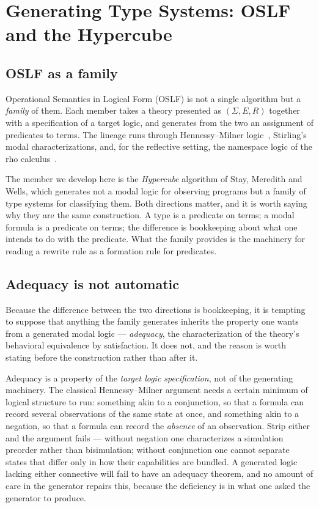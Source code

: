 \chapter{Generating Type Systems: OSLF and the Hypercube}
\label{ch:hypercube}

\section{OSLF as a family}

Operational Semantics in Logical Form (OSLF) is not a single algorithm but a
\emph{family} of them. Each member takes a theory presented as $(\Sigma, E, R)$ together
with a specification of a target logic, and generates from the two an assignment of
predicates to terms. The lineage runs through Hennessy--Milner
logic~\cite{HennessyMilner1985}, Stirling's modal characterizations, and, for the
reflective setting, the namespace logic of the rho calculus~\cite{NamespaceLogic}.

The member we develop here is the \emph{Hypercube} algorithm of Stay, Meredith and
Wells, which generates not a modal logic for observing programs but a family of type
systems for classifying them. Both directions matter, and it is worth saying why they are
the same construction. A type is a predicate on terms; a modal formula is a predicate on
terms; the difference is bookkeeping about what one intends to do with the predicate. What
the family provides is the machinery for reading a rewrite rule as a formation rule for
predicates.

\section{Adequacy is not automatic}
\label{ob:subsec:adequacy}

Because the difference between the two directions is bookkeeping, it is tempting to
suppose that anything the family generates inherits the property one wants from a
generated modal logic --- \emph{adequacy}, the characterization of the theory's
behavioral equivalence by satisfaction. It does not, and the reason is worth stating
before the construction rather than after it.

Adequacy is a property of the \emph{target logic specification}, not of the generating
machinery. The classical Hennessy--Milner argument needs a certain minimum of logical
structure to run: something akin to a conjunction, so that a formula can record several
observations of the same state at once, and something akin to a negation, so that a
formula can record the \emph{absence} of an observation. Strip either and the argument
fails --- without negation one characterizes a simulation preorder rather than
bisimulation; without conjunction one cannot separate states that differ only in how
their capabilities are bundled. A generated logic lacking either connective will fail to
have an adequacy theorem, and no amount of care in the generator repairs this, because
the deficiency is in what one asked the generator to produce.

